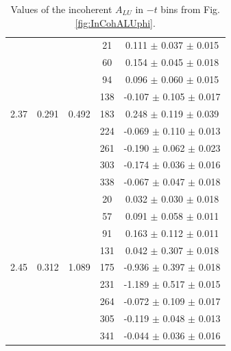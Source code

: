 \documentclass{article}
\begin{document}
\begin{table}[!h]
\begin{center}
\begin{tabular}{|c|c|c|c|c|}
        &       &        &   21    &  0.111   $\pm$  0.037  $\pm$ 0.015  \\
        &       &        &   60    &  0.154   $\pm$  0.045  $\pm$ 0.018  \\
        &       &        &   94    &  0.096   $\pm$  0.060  $\pm$ 0.015  \\
        &       &        &  138    & -0.107   $\pm$  0.105  $\pm$ 0.017  \\
  2.37  & 0.291 & 0.492  &  183    &  0.248   $\pm$  0.119  $\pm$ 0.039  \\
        &       &        &  224    & -0.069   $\pm$  0.110  $\pm$ 0.013  \\
        &       &        &  261    & -0.190   $\pm$  0.062  $\pm$ 0.023  \\
        &       &        &  303    & -0.174   $\pm$  0.036  $\pm$ 0.016  \\
        &       &        &  338    & -0.067   $\pm$  0.047  $\pm$ 0.018  \\
  \hline 
        &       &        &   20    &  0.032   $\pm$  0.030  $\pm$ 0.018  \\
        &       &        &   57    &  0.091   $\pm$  0.058  $\pm$ 0.011  \\
        &       &        &   91    &  0.163   $\pm$  0.112  $\pm$ 0.011  \\
        &       &        &  131    &  0.042   $\pm$  0.307  $\pm$ 0.018  \\
  2.45  & 0.312 & 1.089  &  175    & -0.936   $\pm$  0.397  $\pm$ 0.018  \\
        &       &        &  231    & -1.189   $\pm$  0.517  $\pm$ 0.015  \\
        &       &        &  264    & -0.072   $\pm$  0.109  $\pm$ 0.017  \\
        &       &        &  305    & -0.119   $\pm$  0.048  $\pm$ 0.013  \\
        &       &        &  341    & -0.044   $\pm$  0.036  $\pm$ 0.016  \\
 \hline
 \end{tabular}
 \caption{Values of the incoherent $A_{LU}$ in $-t$ bins from Fig. \ref{fig:InCohALUphi}.}
 \label{table:InCoh_t_BSA}
 \end{center}
\end{table}
\end{document}
